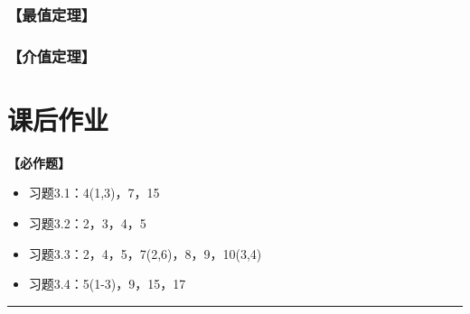 \subsubsection{【最值定理】}


\subsubsection{【介值定理】}



% 
% 
% 
% 
% 
% 
% 



\newpage

\section*{课后作业}

{\bf 【必作题】}

\begin{itemize}
  \item 习题3.1：4(1,3)，7，15
  \item 习题3.2：2，3，4，5
  \item 习题3.3：2，4，5，7(2,6)，8，9，10(3,4)
  \item 习题3.4：5(1-3)，9，15，17
\end{itemize}

\bigskip

\hrule

\bigskip
\bigskip

